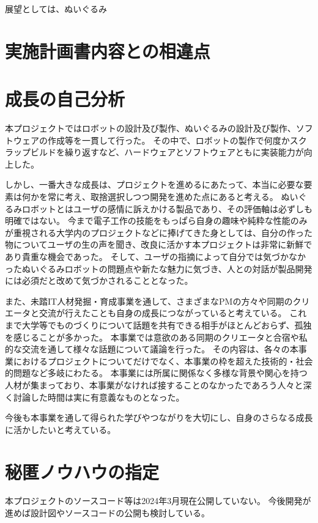\documentclass[uplatex,a4paper,12pt]{jsarticle}
\begin{document}
展望としては、ぬいぐるみ


\section{実施計画書内容との相違点}


\section{成長の自己分析}
本プロジェクトではロボットの設計及び製作、ぬいぐるみの設計及び製作、ソフトウェアの作成等を一貫して行った。
その中で、ロボットの製作で何度かスクラップビルドを繰り返すなど、ハードウェアとソフトウェアともに実装能力が向上した。

しかし、一番大きな成長は、プロジェクトを進めるにあたって、本当に必要な要素は何かを常に考え、取捨選択しつつ開発を進めた点にあると考える。
ぬいぐるみロボットとはユーザの感情に訴えかける製品であり、その評価軸は必ずしも明確ではない。
今まで電子工作の技能をもっぱら自身の趣味や純粋な性能のみが重視される大学内のプロジェクトなどに捧げてきた身としては、自分の作った物についてユーザの生の声を聞き、改良に活かす本プロジェクトは非常に新鮮であり貴重な機会であった。
そして、ユーザの指摘によって自分では気づかなかったぬいぐるみロボットの問題点や新たな魅力に気づき、人との対話が製品開発には必須だと改めて気づかされることとなった。

また、未踏IT人材発掘・育成事業を通して、さまざまなPMの方々や同期のクリエータと交流が行えたことも自身の成長につながっていると考えている。
これまで大学等でものづくりについて話題を共有できる相手がほとんどおらず、孤独を感じることが多かった。
本事業では意欲のある同期のクリエータと合宿や私的な交流を通して様々な話題について議論を行った。
その内容は、各々の本事業におけるプロジェクトについてだけでなく、本事業の枠を超えた技術的・社会的問題など多岐にわたる。
本事業には所属に関係なく多様な背景や関心を持つ人材が集まっており、本事業がなければ接することのなかったであろう人々と深く討論した時間は実に有意義なものとなった。

今後も本事業を通して得られた学びやつながりを大切にし、自身のさらなる成長に活かしたいと考えている。


\section{秘匿ノウハウの指定}
本プロジェクトのソースコード等は2024年3月現在公開していない。
今後開発が進めば設計図やソースコードの公開も検討している。
\end{document}
